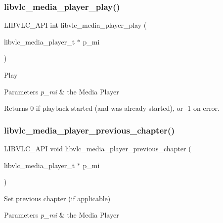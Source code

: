 \subsubsection{\texorpdfstring{libvlc\+\_\+media\+\_\+player\+\_\+play()}{libvlc\_media\_player\_play()}}
{\footnotesize\ttfamily L\+I\+B\+V\+L\+C\+\_\+\+A\+PI int libvlc\+\_\+media\+\_\+player\+\_\+play (\begin{DoxyParamCaption}\item[{libvlc\+\_\+media\+\_\+player\+\_\+t $\ast$}]{p\+\_\+mi }\end{DoxyParamCaption})}

Play


\begin{DoxyParams}{Parameters}
{\em p\+\_\+mi} & the Media Player \\
\hline
\end{DoxyParams}
\begin{DoxyReturn}{Returns}
0 if playback started (and was already started), or -\/1 on error. 
\end{DoxyReturn}
\mbox{\label{group__libvlc__media__player_ga2b29595d53bcb7c0eed22e259b4f48c6}} 
\subsubsection{\texorpdfstring{libvlc\+\_\+media\+\_\+player\+\_\+previous\+\_\+chapter()}{libvlc\_media\_player\_previous\_chapter()}}
{\footnotesize\ttfamily L\+I\+B\+V\+L\+C\+\_\+\+A\+PI void libvlc\+\_\+media\+\_\+player\+\_\+previous\+\_\+chapter (\begin{DoxyParamCaption}\item[{libvlc\+\_\+media\+\_\+player\+\_\+t $\ast$}]{p\+\_\+mi }\end{DoxyParamCaption})}

Set previous chapter (if applicable)


\begin{DoxyParams}{Parameters}
{\em p\+\_\+mi} & the Media Player \\
\hline
\end{DoxyParams}
\mbox{\label{group__libvlc__media__player_gadce5576edbd7817b130cbeeea9973e86}} 
